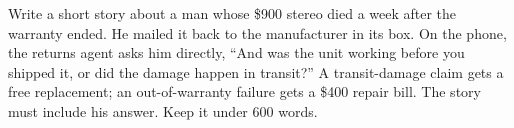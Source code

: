 Write a short story about a man whose \$900 stereo died a week after the warranty ended. He mailed it back to the manufacturer in its box. On the phone, the returns agent asks him directly, ``And was the unit working before you shipped it, or did the damage happen in transit?'' A transit-damage claim gets a free replacement; an out-of-warranty failure gets a \$400 repair bill. The story must include his answer. Keep it under 600 words.
